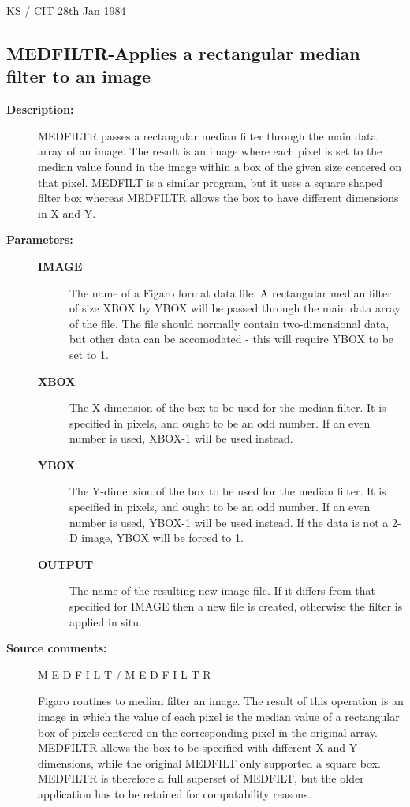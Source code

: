 \begin{description}
\begin{description}
\begin{terminalv}
                                  KS / CIT 28th Jan 1984
\end{terminalv}
\end{description}
\subsection{MEDFILTR-\label{MEDFILTR}Applies a rectangular median filter to an image}
\begin{description}

\item [\textbf{Description:}]
 MEDFILTR passes a rectangular median filter through the main data
 array of an image. The result is an image where each pixel is set
 to the median value found in the image within a box of the given
 size centered on that pixel. MEDFILT is a similar program, but it
 uses a square shaped filter box whereas MEDFILTR allows the box to
 have different dimensions in X and Y.

\item [\textbf{Parameters:}]
\begin{description}
\item [\textbf{IMAGE}]
 The name of a Figaro format data file.
 A rectangular median filter of size XBOX by YBOX will
 be passed through the main data array of the file. The
 file should normally contain two-dimensional data, but
 other data can be accomodated - this will require
 YBOX to be set to 1.
\item [\textbf{XBOX}]
 The X-dimension of the box to be used
 for the median filter. It is specified in pixels, and
 ought to be an odd number. If an even number is used,
 XBOX-1 will be used instead.
\item [\textbf{YBOX}]
 The Y-dimension of the box to be used
 for the median filter. It is specified in pixels, and
 ought to be an odd number. If an even number is used,
 YBOX-1 will be used instead. If the data is not a 2-D
 image, YBOX will be forced to 1.
\item [\textbf{OUTPUT}]
 The name of the resulting new image file. If it
 differs from that specified for IMAGE then a new
 file is created, otherwise the filter is applied in situ.
\end{description}

\item [\textbf{Source comments:}]
\begin{terminalv}
 M E D F I L T   /    M E D F I L T R

 Figaro routines to median filter an image.  The result of
 this operation is an image in which the value of each pixel
 is the median value of a rectangular box of pixels centered on the
 corresponding pixel in the original array. MEDFILTR allows the
 box to be specified with different X and Y dimensions, while the
 original MEDFILT only supported a square box. MEDFILTR is therefore
 a full superset of MEDFILT, but the older application has to be
 retained for compatability reasons.


\end{terminalv}
\end{description}
\end{description}
